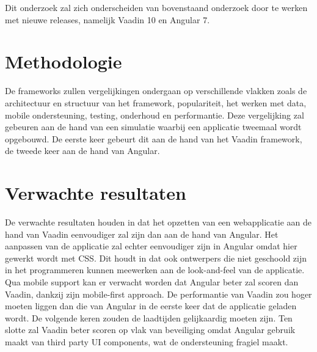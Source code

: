 Dit onderzoek zal zich onderscheiden van bovenstaand onderzoek door te werken met nieuwe releases, namelijk Vaadin 10 en Angular 7. 



\section{Methodologie}
\label{sec:methodologie}

De frameworks zullen vergelijkingen ondergaan op verschillende vlakken zoals de architectuur en structuur van het framework, populariteit,  het werken met data, mobile ondersteuning, testing, onderhoud en performantie. Deze vergelijking zal gebeuren aan de hand van een simulatie waarbij een applicatie tweemaal wordt opgebouwd. De eerste keer gebeurt dit aan de hand van het Vaadin framework, de tweede keer aan de hand van Angular. 
\section{Verwachte resultaten}
\label{sec:verwachte_resultaten}

De verwachte resultaten houden in dat het opzetten van een webapplicatie aan de hand van Vaadin eenvoudiger zal zijn dan aan de hand van Angular. Het aanpassen van de applicatie zal echter eenvoudiger zijn in Angular omdat hier gewerkt wordt met CSS. Dit houdt in dat ook ontwerpers die niet geschoold zijn in het programmeren kunnen meewerken aan de look-and-feel van de applicatie. 
Qua mobile support kan er verwacht worden dat Angular beter zal scoren dan Vaadin, dankzij zijn mobile-first approach.
De performantie van Vaadin zou hoger moeten liggen dan die van Angular in de eerste keer dat de applicatie geladen wordt. De volgende keren zouden de laadtijden gelijkaardig moeten zijn. 
Ten slotte zal Vaadin beter scoren op vlak van beveiliging omdat Angular gebruik maakt van third party UI components, wat de ondersteuning fragiel maakt. 

